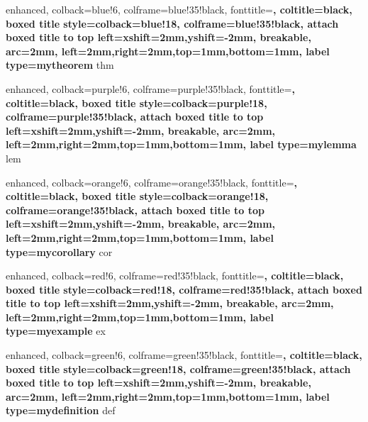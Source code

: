 
%
{enhanced,
  colback=blue!6,
  colframe=blue!35!black,
  fonttitle=\bfseries,
  coltitle=black,
  boxed title style={colback=blue!18, colframe=blue!35!black},
  attach boxed title to top left={xshift=2mm,yshift=-2mm},
  breakable,
  arc=2mm,
  left=2mm,right=2mm,top=1mm,bottom=1mm,
  label type=mytheorem
}{thm}

%
{enhanced,
  colback=purple!6,
  colframe=purple!35!black,
  fonttitle=\bfseries,
  coltitle=black,
  boxed title style={colback=purple!18, colframe=purple!35!black},
  attach boxed title to top left={xshift=2mm,yshift=-2mm},
  breakable,
  arc=2mm,
  left=2mm,right=2mm,top=1mm,bottom=1mm,
  label type=mylemma
}{lem}

%
{enhanced,
  colback=orange!6,
  colframe=orange!35!black,
  fonttitle=\bfseries,
  coltitle=black,
  boxed title style={colback=orange!18, colframe=orange!35!black},
  attach boxed title to top left={xshift=2mm,yshift=-2mm},
  breakable,
  arc=2mm,
  left=2mm,right=2mm,top=1mm,bottom=1mm,
  label type=mycorollary
}{cor}

%
{enhanced,
  colback=red!6,
  colframe=red!35!black,
  fonttitle=\bfseries,
  coltitle=black,
  boxed title style={colback=red!18, colframe=red!35!black},
  attach boxed title to top left={xshift=2mm,yshift=-2mm},
  breakable,
  arc=2mm,
  left=2mm,right=2mm,top=1mm,bottom=1mm,
  label type=myexample
}{ex}

%
{enhanced,
  colback=green!6,
  colframe=green!35!black,
  fonttitle=\bfseries,
  coltitle=black,
  boxed title style={colback=green!18, colframe=green!35!black},
  attach boxed title to top left={xshift=2mm,yshift=-2mm},
  breakable,
  arc=2mm,
  left=2mm,right=2mm,top=1mm,bottom=1mm,
  label type=mydefinition
}{def}






